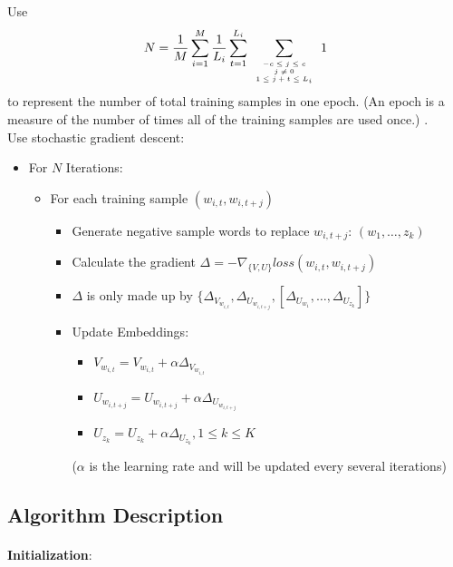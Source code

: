 \documentclass[12pt,a4paper,twoside]{book}
\begin{document}
	
Use 
	$$N = \frac{1}{M}\sum_{i=1}^M\frac{1}{L_i}\sum_{t=1}^{L_i}\sum\limits_{\mbox{\tiny$\begin{array}{c}-c\leq j \leq c\\ j\neq 0\\ 1\leq j+t\leq L_i\end{array}$}} 1$$
	to represent the number of total training samples in one epoch. (An epoch is a measure of the number of times all of the training samples are used once.) .\\
	
	Use stochastic gradient descent: 
	\begin{itemize}
	\item For $N$ Iterations: 
		\begin{itemize}
		\item For each training sample $(w_{i,t},w_{i,{t+j}})$
		\begin{itemize}
		\item Generate negative sample words to replace $w_{i,t+j}$: $(w_1,\ldots,z_k)$
		\item Calculate the gradient $\Delta = -\nabla_{\{V,U\}} loss(w_{i,t},w_{i,{t+j}})$
		\item $\Delta$ is only made up by $\{\Delta_{V_{w_{i,t}}}, \Delta_{U_{w_{i,t+j}}}, [\Delta_{U_{w_1}},\ldots,\Delta_{U_{z_k}}]\}$
		\item Update Embeddings: 
		\begin{itemize}
		\item $V_{w_{i,t}} = V_{w_{i,t}}+\alpha\Delta_{V_{w_{i,t}}}$
		\item $U_{w_{i,t+j}} = U_{w_{i,t+j}}+\alpha\Delta_{U_{w_{i,t+j}}}$
		\item $U_{z_k} = U_{z_k}+\alpha\Delta_{U_{z_k}}, 1\leq k\leq K$ 
		\end{itemize}
		($\alpha$ is the learning rate and will be updated every several iterations)
		\end{itemize}
		\end{itemize}
	\end{itemize}

\subsection{Algorithm Description}
\paragraph{} \textbf{Initialization}: \\
\end{document}

